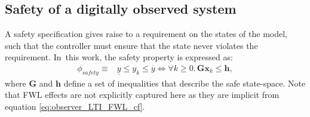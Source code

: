 \documentclass[sigconf]{llncs}
\newcommand{\mat}[1]{\boldsymbol{#1}}
\renewcommand{\vec}[1]{\boldsymbol{#1}}
\begin{document}
\subsection{Safety of a digitally observed system}\label{sec:cof_safety}
A safety specification gives raise to a requirement on the
states of the model, such that the controller
must ensure that the state never violates the
requirement.
In~this work, the safety property is expressed as:
%
\begin{align}
  \phi_\mathit{safety}\equiv& \underline{y} \leq y_k \leq \overline{y}
\iff \forall k\geq 0.\, \mat{G}\vec{x}_k \leq \vec{h},
\label{eq:safetyspec}
\end{align}
%
where $\mat{G}$ and $\vec{h}$ define a set of inequalities that describe the safe state-space.
%
Note that FWL effects are not explicitly captured here
as they are implicit from equation \ref{eq:observer_LTI_FWL_cf}.
%
%
%
\end{document}
